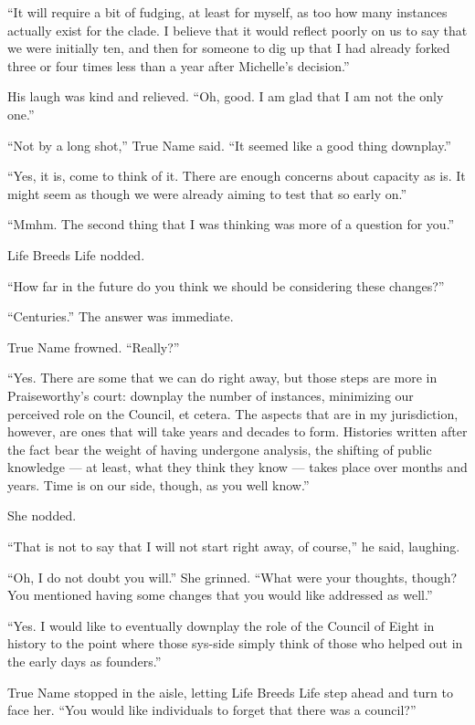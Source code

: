 ``It will require a bit of fudging, at least for myself, as too how many instances actually exist for the clade. I believe that it would reflect poorly on us to say that we were initially ten, and then for someone to dig up that I had already forked three or four times less than a year after Michelle's decision.''

His laugh was kind and relieved. ``Oh, good. I am glad that I am not the only one.''

``Not by a long shot,'' True Name said. ``It seemed like a good thing downplay.''

``Yes, it is, come to think of it. There are enough concerns about capacity as is. It might seem as though we were already aiming to test that so early on.''

``Mmhm. The second thing that I was thinking was more of a question for you.''

Life Breeds Life nodded.

``How far in the future do you think we should be considering these changes?''

``Centuries.'' The answer was immediate.

True Name frowned. ``Really?''

``Yes. There are some that we can do right away, but those steps are more in Praiseworthy's court: downplay the number of instances, minimizing our perceived role on the Council, et cetera. The aspects that are in my jurisdiction, however, are ones that will take years and decades to form. Histories written after the fact bear the weight of having undergone analysis, the shifting of public knowledge — at least, what they think they know — takes place over months and years. Time is on our side, though, as you well know.''

She nodded.

``That is not to say that I will not start right away, of course,'' he said, laughing.

``Oh, I do not doubt you will.'' She grinned. ``What were your thoughts, though? You mentioned having some changes that you would like addressed as well.''

``Yes. I would like to eventually downplay the role of the Council of Eight in history to the point where those sys-side simply think of those who helped out in the early days as founders.''

True Name stopped in the aisle, letting Life Breeds Life step ahead and turn to face her. ``You would like individuals to forget that there was a council?''

